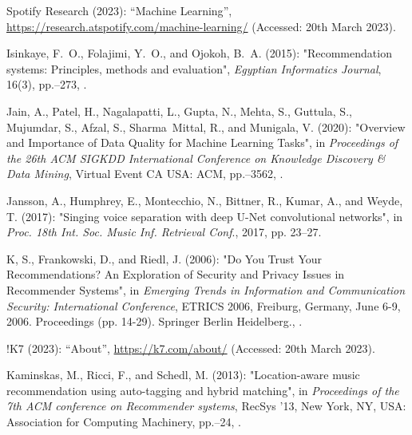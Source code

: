 \documentclass[11pt,titlepage,oneside]{book}
\begin{document}
\begin{thebibliography}{97}
	Spotify Research (2023): \enquote{Machine
		{Learning}},
	\urlprefix\url{https://research.atspotify.com/machine-learning/} (Accessed: 20th March 2023).
	
	Isinkaye, F.~O., Folajimi, Y.~O., and Ojokoh, B.~A. (2015):
	"Recommendation systems: {Principles}, methods and evaluation",
	\textit{Egyptian Informatics Journal}, 16(3), pp.--273,
	.
	
	Jain, A., Patel, H., Nagalapatti, L., Gupta, N., Mehta, S., Guttula, S.,
	Mujumdar, S., Afzal, S., Sharma~Mittal, R., and Munigala, V. (2020):
	"Overview and {Importance} of {Data} {Quality} for {Machine}
		{Learning} {Tasks}", in \textit{Proceedings of the 26th {ACM} {SIGKDD}
		{International} {Conference} on {Knowledge} {Discovery} \& {Data} {Mining}},
	Virtual Event CA USA: ACM, pp.--3562,
	.
	
	Jansson, A., Humphrey, E., Montecchio, N., Bittner, R., Kumar, A., and Weyde,
	T. (2017): "Singing voice separation with deep {U}-{Net}
		convolutional networks", in \textit{Proc. 18th Int. Soc. Music Inf. Retrieval Conf}., 2017,
		pp. 23–27.
	
	K, S., Frankowski, D., and Riedl, J. (2006): "Do {You} {Trust} {Your}
		{Recommendations}? {An} {Exploration} of {Security} and {Privacy} {Issues} in
		{Recommender} {Systems}", in \textit{Emerging Trends in Information and Communication Security: International Conference}, ETRICS 2006, Freiburg, Germany, June 6-9, 2006. Proceedings (pp. 14-29). Springer Berlin Heidelberg.,
	.
	
	!K7 (2023): \enquote{About}, \urlprefix\url{https://k7.com/about/} (Accessed: 20th March 2023).
	
	Kaminskas, M., Ricci, F., and Schedl, M. (2013): "Location-aware music
		recommendation using auto-tagging and hybrid matching", in
	\textit{Proceedings of the 7th {ACM} conference on {Recommender} systems},
	{RecSys} '13, New York, NY, USA: Association for Computing Machinery,
	pp.--24, .
	

\end{thebibliography}
\end{document}
